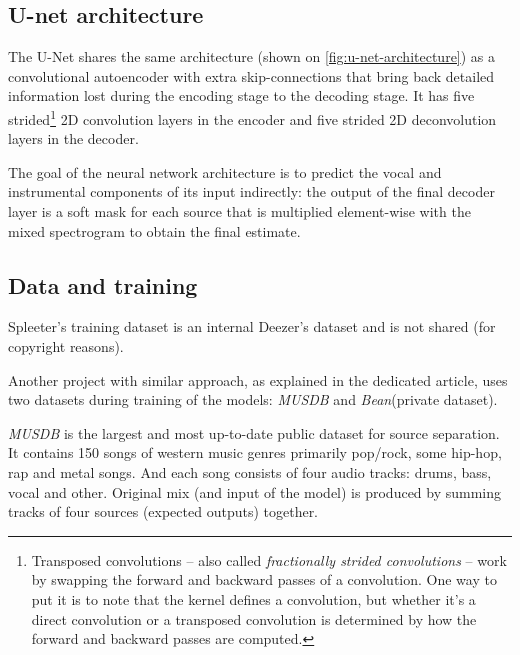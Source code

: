 \subsection{U-net architecture}\label{subsec:music-source-separation:u-net-architecture}
The U-Net shares the same architecture (shown on \cref{fig:u-net-architecture}) as a convolutional autoencoder with
extra skip-connections that bring back detailed information lost during the encoding stage to the decoding stage. It has
five strided\footnote{Transposed convolutions – also called \textit{fractionally strided convolutions} – work by
swapping the forward and backward passes of a convolution. One way to put it is to note that the kernel defines
a convolution, but whether it’s a direct convolution or a transposed convolution is determined by how the forward and
backward passes are computed.\cite{dumoulin2016guide}} 2D convolution layers in the encoder and five strided 2D
deconvolution layers in the decoder.

The goal of the neural network architecture is to predict the vocal and instrumental components of its input indirectly:
the output of the final decoder layer is a soft mask for each source that is multiplied element-wise with the mixed
spectrogram to obtain the final estimate.


\pagebreak

\subsection{Data and training}\label{subsec:music-source-separation:data-and-training}

Spleeter's training dataset is an internal Deezer's dataset and is not shared (for copyright reasons).

Another project with similar approach, as explained in the dedicated article\cite{singing-voice-separation-article},
uses two datasets during training of the models: \textit{MUSDB}\cite{musdb18} and \textit{Bean}(private dataset).

\textit{MUSDB} is the largest and most up-to-date public dataset for source separation\cite{musdb18}. It contains 150
songs of western music genres primarily pop/rock, some hip-hop, rap and metal songs. And each song consists of four
audio tracks: drums, bass, vocal and other. Original mix (and input of the model) is produced by summing tracks of four
sources (expected outputs) together.


